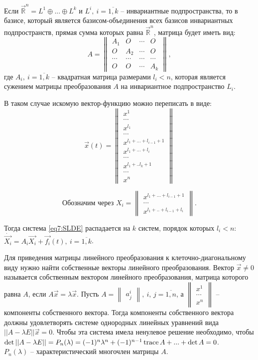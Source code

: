 Если $\overrightarrow{\mathbb{R}}^n = L^1 \oplus ... \oplus L^k$ и $L^i, ~i = \overline{1, k}$ -- инвариантные подпространства, то в базисе, который является базисом-объединения всех базисов инвариантных подпространств, прямая сумма которых равна $\overrightarrow{\mathbb{R}}^n$, матрица будет иметь вид:
\[A = \begin{Vmatrix} A_1 & O & \cdots & O \\ O & A_2 & \cdots & O \\ \cdots & \cdots & \cdots & \cdots \\ O & O &\cdots & A_k \end{Vmatrix}, \]
где $A_i, ~i = \overline{1, k}$ -- квадратная матрица размерами $l_i < n$, которая является сужением матрицы преобразования $A$ на инвариантное подпространство $L_i$.

В таком случае искомую вектор-функцию можно переписать в виде: 
\[ \overrightarrow{x}(t) = \begin{Vmatrix} x^1 \\ \cdots \\ x^{l_1} \\ \cdots \\ x^{l_1 + ... + l_{i-1} + 1} \\ x^{l_1 + ... + l_{i}} \\ \cdots \\ x^{l_1 + .. l_k + 1} \\ \cdots \\ x^n \end{Vmatrix}\]

\[\text{Обозначим через } X_i = \begin{Vmatrix} x^{l_1 + ... + l_{i-1} + 1} \\ \cdots \\ x^{l_1 + .. + l_{i-1} + l_{i}}\end{Vmatrix}. \]

Тогда система \eqref{eq7:SLDE} распадается на $k$ систем, порядок которых $l_i < n$: \\
$\dot{\overrightarrow{X_i}} = A_i \overrightarrow{X_i} + \overrightarrow{f_i}(t), ~i =\overline{1, k}$.

Для приведения матрицы линейного преобразования к клеточно-диагональному виду нужно найти собственные векторы линейного преобразования. 
Вектор $\overrightarrow{x} \neq 0$ называется собственным вектором линейного преобразования, матрица которого равна $A$, если $A\overrightarrow{x} = \lambda \overrightarrow{x}$. 
Пусть $A = \begin{Vmatrix} a_j^i \end{Vmatrix}, ~i,\,j = \overline{1, n}$, а $\begin{Vmatrix} x^1 \\ \cdots \\ x^n \end{Vmatrix}$ -- компоненты собственного вектора.
Тогда компоненты собственного вектора должны удовлетворять системе однородных линейных уравнений вида $|| A - \lambda E|| \overrightarrow{x} = 0$. 
Чтобы эта система имела ненулевое решение необходимо, чтобы $\det || A - \lambda E|| = P_n(\lambda) = (-1)^n \lambda^n + (-1)^{n-1} \operatorname{trace} A + ... + \det A = 0$. \\
$P_n(\lambda)$ -- характеристический многочлен матрицы $A$. 

